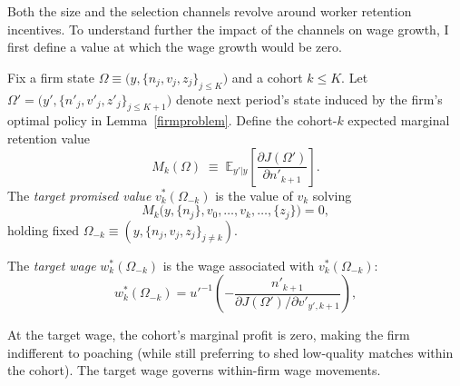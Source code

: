 Both the size and the selection channels revolve around worker retention incentives. To understand further the impact of the channels on wage growth, I first define a value at which the wage growth would be zero.


\begin{definition}\label{def:targetwage}
Fix a firm state $\Omega \equiv \big(y,\{n_j,v_j,z_j\}_{j\le K}\big)$ and a cohort $k\le K$.
Let $\Omega'=\big(y',\{n'_j,v'_j,z'_j\}_{j\le K+1}\big)$ denote next period's state induced by the firm's
optimal policy in Lemma~\ref{firmproblem}. Define the cohort-$k$ expected marginal retention value
\begin{equation*}\label{eq:M_def}
M_k(\Omega)
\;\equiv\;
\mathbb E_{y'|y}\left[\frac{\partial J(\Omega')}{\partial n'_{k+1}}\right].
\end{equation*}
The \emph{target promised value} $v_k^*(\Omega_{-k})$ is the value of $v_k$ solving
\begin{equation*}\label{eq:target_v_def}
M_k\!\big(y,\{n_j\},v_0,\ldots,v_k,\ldots,\{z_j\}\big)=0,
\end{equation*}
holding fixed $\Omega_{-k}\equiv (y,\{n_j,v_j,z_j\}_{j\neq k})$.

The \emph{target wage} $w_k^*(\Omega_{-k})$ is the wage associated with $v_k^*(\Omega_{-k})$:
\begin{equation*}\label{eq:wstar_map}
w_k^*(\Omega_{-k})
=
u'^{-1}\!\left(
-\frac{n'_{k+1}}{\partial J(\Omega')/\partial v'_{y',k+1}}
\right),
\end{equation*}
\end{definition}

At the target wage, the cohort’s marginal profit is zero, making the firm indifferent to poaching (while still preferring to shed low-quality matches within the cohort). The target wage governs within-firm wage movements.

